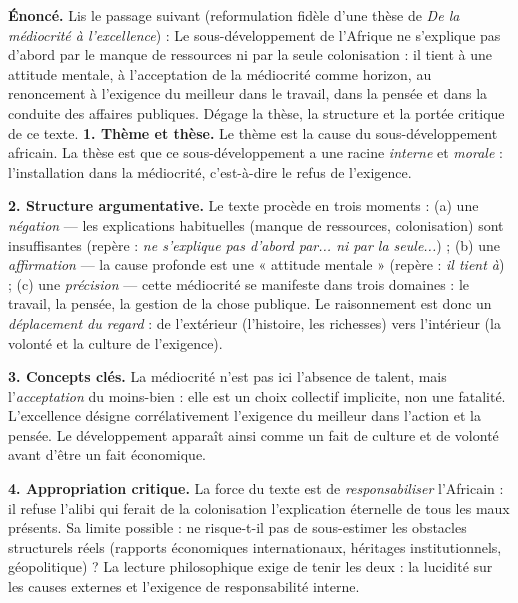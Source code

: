 \documentclass[11pt]{article}
\newcommand{\cle}[1]{{\popxbold\color{popdark}#1}}
\begin{document}
\begin{exoresolu}
\textbf{Énoncé.} Lis le passage suivant (reformulation fidèle d'une thèse de \emph{De la médiocrité à l'excellence}) : \guillemotleft Le sous-développement de l'Afrique ne s'explique pas d'abord par le manque de ressources ni par la seule colonisation : il tient à une attitude mentale, à l'acceptation de la médiocrité comme horizon, au renoncement à l'exigence du meilleur dans le travail, dans la pensée et dans la conduite des affaires publiques. \guillemotright Dégage la thèse, la structure et la portée critique de ce texte.
\tcblower
\textbf{1. Thème et thèse.} Le thème est la cause du sous-développement africain. La thèse est que ce sous-développement a une racine \emph{interne} et \emph{morale} : l'installation dans la médiocrité, c'est-à-dire le refus de l'exigence.

\textbf{2. Structure argumentative.} Le texte procède en trois moments : (a) une \emph{négation} — les explications habituelles (manque de ressources, colonisation) sont insuffisantes (repère : \emph{ne s'explique pas d'abord par... ni par la seule...}) ; (b) une \emph{affirmation} — la cause profonde est une « attitude mentale » (repère : \emph{il tient à}) ; (c) une \emph{précision} — cette médiocrité se manifeste dans trois domaines : le travail, la pensée, la gestion de la chose publique. Le raisonnement est donc un \emph{déplacement du regard} : de l'extérieur (l'histoire, les richesses) vers l'intérieur (la volonté et la culture de l'exigence).

\textbf{3. Concepts clés.} La \cle{médiocrité} n'est pas ici l'absence de talent, mais l'\emph{acceptation} du moins-bien : elle est un choix collectif implicite, non une fatalité. L'\cle{excellence} désigne corrélativement l'exigence du meilleur dans l'action et la pensée. Le \cle{développement} apparaît ainsi comme un fait de culture et de volonté avant d'être un fait économique.

\textbf{4. Appropriation critique.} La force du texte est de \emph{responsabiliser} l'Africain : il refuse l'alibi qui ferait de la colonisation l'explication éternelle de tous les maux présents. Sa limite possible : ne risque-t-il pas de sous-estimer les obstacles structurels réels (rapports économiques internationaux, héritages institutionnels, géopolitique) ? La lecture philosophique exige de tenir les deux : la lucidité sur les causes externes et l'exigence de responsabilité interne.
\end{exoresolu}
\end{document}
